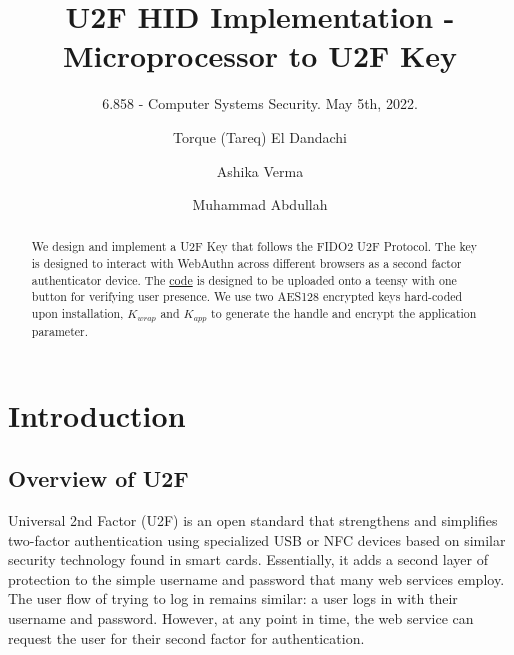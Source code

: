 \documentclass[acmtog,review]{acmart}
\begin{document}
\title{U2F HID Implementation - Microprocessor to U2F Key}
\subtitle{6.858 - Computer Systems Security. May 5th, 2022.}

\author{Torque (Tareq) El Dandachi}

\author{Ashika Verma}

\author{Muhammad Abdullah}

\renewcommand{\shortauthors}{Torque (Tareq) El Dandachi, Ashika Verma, Muhammad Abdullah}

\renewcommand\footnotetextcopyrightpermission[1]{} %
\pagestyle{plain} %
\fancyfoot{}

\makeatletter
\let\@authorsaddresses\@empty
\makeatother


\begin{abstract}
We design and implement a U2F Key that follows the FIDO2 U2F Protocol. The key is
designed to interact with WebAuthn across different browsers as a second factor
authenticator device. The \href{https://github.com/tareqdandachi/u2f}{code} is 
designed to be uploaded onto a teensy with one button for verifying user presence.
We use two AES128 encrypted keys hard-coded upon installation, $K_{wrap}$ and $K_{app}$ to generate the handle and encrypt the application parameter.
\end{abstract}


\maketitle
\thispagestyle{empty}

\section{Introduction}
 
\subsection{Overview of U2F}
Universal 2nd Factor (U2F) is an open standard that strengthens and simplifies two-factor authentication using specialized USB or NFC devices based on similar security technology found in smart cards. Essentially, it adds a second layer of protection to the simple username and password that many web services employ. The user flow of trying to log in remains similar: a user logs in with their username and password. However, at any point in time, the web service can request the user for their second factor for authentication. 
\end{document}
